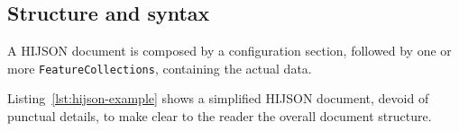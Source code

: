





\subsection{Structure and syntax}\label{syntax-structure}

A HIJSON document is composed by a configuration section, followed by one or more \texttt{FeatureCollections}, containing the actual data.

Listing~\ref{lst:hijson-example} shows a simplified HIJSON document, devoid of punctual details, to make clear to the reader the overall document structure.

